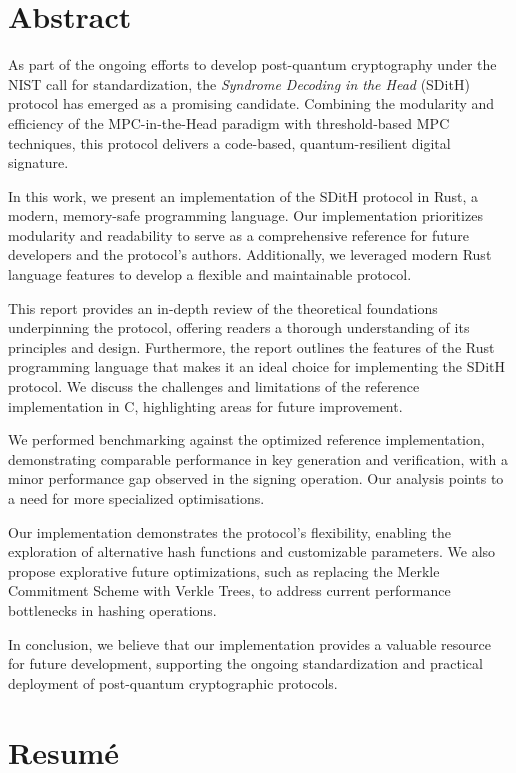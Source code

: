 \documentclass[11pt]{report}
\theoremstyle{definition}
\theoremstyle{plain}
\begin{document}
\chapter*{Abstract}
As part of the ongoing efforts to develop post-quantum cryptography under the NIST call for standardization, the \textit{Syndrome Decoding in the Head} (SDitH) protocol has emerged as a promising candidate. Combining the modularity and efficiency of the MPC-in-the-Head paradigm with threshold-based MPC techniques, this protocol delivers a code-based, quantum-resilient digital signature.

In this work, we present an implementation of the SDitH protocol in Rust, a modern, memory-safe programming language. Our implementation prioritizes modularity and readability to serve as a comprehensive reference for future developers and the protocol's authors. Additionally, we leveraged modern Rust language features to develop a flexible and maintainable protocol.

This report provides an in-depth review of the theoretical foundations underpinning the protocol, offering readers a thorough understanding of its principles and design. Furthermore, the report outlines the features of the Rust programming language that makes it an ideal choice for implementing the SDitH protocol. We discuss the challenges and limitations of the reference implementation in C, highlighting areas for future improvement.

We performed benchmarking against the optimized reference implementation, demonstrating comparable performance in key generation and verification, with a minor performance gap observed in the signing operation. Our analysis points to a need for more specialized optimisations.

Our implementation demonstrates the protocol's flexibility, enabling the exploration of alternative hash functions and customizable parameters. We also propose explorative future optimizations, such as replacing the Merkle Commitment Scheme with Verkle Trees, to address current performance bottlenecks in hashing operations.

In conclusion, we believe that our implementation provides a valuable resource for future development, supporting the ongoing standardization and practical deployment of post-quantum cryptographic protocols.

\chapter*{Resum\'e}
\end{document}
